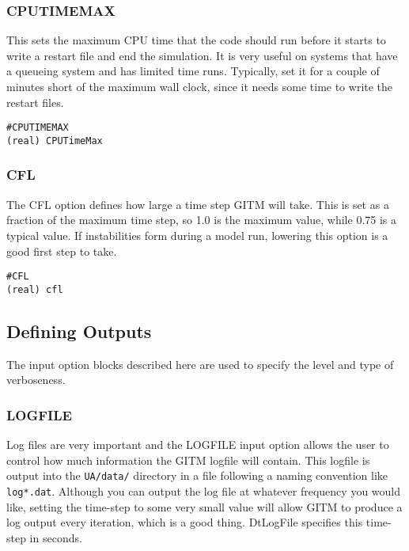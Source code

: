 \subsubsection{CPUTIMEMAX}
\label{cputimemax.sec}

This sets the maximum CPU time that the code should run before it starts to write a restart file and end the simulation.  It is very useful on systems that have a queueing system and has limited time runs.  Typically, set it for a couple of minutes short of the maximum wall clock, since it needs some time to write the restart files.

\begin{verbatim}
#CPUTIMEMAX
(real) CPUTimeMax
\end{verbatim}

\subsubsection{CFL}
\label{cfl.sec}

The CFL option defines how large a time step GITM will take.  This is set as a fraction of the maximum time step, so 1.0 is the maximum value, while 0.75 is a typical value.  If instabilities form during a model run, lowering this option is a good first step to take.

\begin{verbatim}
#CFL
(real) cfl
\end{verbatim}

\subsection{Defining Outputs}
\label{def_out.sec}

The input option blocks described here are used to specify the level and type of verboseness. 

\subsubsection{LOGFILE}
\label{logfile.sec}

Log files are very important and the LOGFILE input option allows the user to control how much information the GITM logfile will contain.  This logfile is output into the {\tt UA/data/} directory in a file following a naming convention like {\tt log*.dat}.  Although you can output the log file at whatever frequency you would like, setting the time-step to some very small value will allow GITM to produce a log output every iteration, which is a good thing.  DtLogFile specifies this time-step in seconds.

